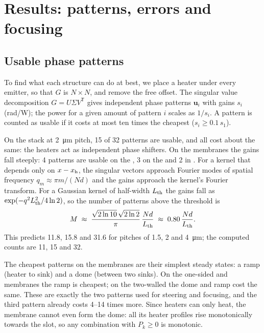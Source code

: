\section{Results: patterns, errors and focusing}
\label{sec:other}

\subsection{Usable phase patterns}
\label{sec:modes}

To find what each structure can do at best, we place a heater under every emitter, so that $G$ is $N\times N$, and
remove the free offset. The singular value decomposition $G=U\Sigma V^{\mathsf T}$ gives independent phase patterns
$\bm u_i$ with gains $s_i$ (rad/W); the power for a given amount of pattern $i$ scales as $1/s_i$. A pattern is
counted as usable if it costs at most ten times the cheapest ($s_i\ge0.1\,s_1$).

On the  stack at \qty{2}{\micro\metre} pitch, \num{15} of \num{32} patterns are usable, and all cost
about the same: the heaters act as independent phase shifters. On the membranes the gains fall steeply: \num{4} patterns are usable on the , \num{3} on the  and \num{2} in
. For a kernel that depends only on $x-x_{\mathrm{h}}$, the singular vectors approach Fourier modes of spatial
frequency $q_m\approx\pi m/(Nd)$ and the gains approach the kernel's Fourier transform. For a Gaussian kernel of
half-width $L_{\mathrm{th}}$ the gains fall as $\exp(-q^2L_{\mathrm{th}}^2/4\ln2)$, so the number of patterns above the threshold is
\begin{equation}
  M \;\approx\; \frac{\sqrt{2\ln 10}\,\sqrt{2\ln 2}}{\pi}\,\frac{N d}{L_{\mathrm{th}}}\;\approx\;0.80\,\frac{N d}{L_{\mathrm{th}}}.
  \label{eq:modecount}
\end{equation}
This predicts \num{11.8}, \num{15.8} and \num{31.6} for pitches of \num{1.5}, \num{2} and \qty{4}{\micro\metre}; the
computed counts are \num{11}, \num{15} and \num{32}.

The cheapest patterns on the membranes are their simplest steady states: a ramp (heater to sink)
and a dome (between two sinks). On the one-sided  and  membranes the ramp is cheapest; on
the two-walled  the dome and ramp cost the same. These are exactly the two patterns used for steering
and focusing, and the third pattern already costs \numrange{4}{14} times more. Since heaters can only heat, the
 membrane cannot even form the dome: all its heater profiles rise monotonically towards the slot, so
any combination with $P_k\ge0$ is monotonic.

